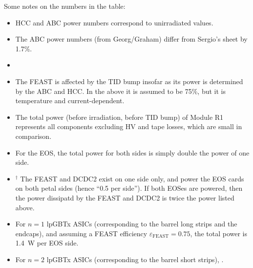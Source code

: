 Some notes on the numbers in the table:
\begin{itemize}
\item HCC and ABC power numbers correspond to unirradiated values.
\item The ABC power numbers (from Georg/Graham) differ from Sergio's sheet by 1.7\%.
\item {}
\item \tid The FEAST is affected by the TID bump insofar as its power is determined by the ABC and HCC.
  In the above it is assumed to be 75\%, but it is temperature and current-dependent.
\item The total power (before irradiation, before TID bump) of Module R1 represents
all components excluding HV and tape losses, which are small in comparison.
\item For the EOS, the total power for both sides is simply double the power of one side.
\item $^\dagger$ The FEAST and DCDC2 exist on one side only, and power the EOS cards on both petal
sides (hence ``0.5 per side''). If both EOSes are powered, then the power dissipatd by the FEAST and
DCDC2 is twice the power listed above.
\item For $n=1$ lpGBTx ASICs (corresponding to the barrel long strips and the endcaps),
and assuming a FEAST efficiency $\varepsilon_\text{FEAST}=0.75$,
the total power is 1.4~W per EOS side.
\item For $n=2$ lpGBTx ASICs (corresponding to the barrel short strips),
.
\end{itemize}


